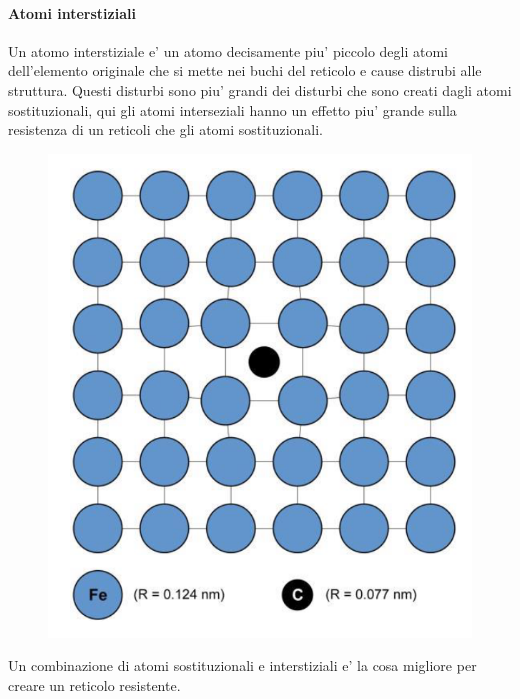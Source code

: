 \documentclass{article}
\begin{document}
                \paragraph{Atomi interstiziali}\mbox \\
                Un atomo interstiziale e' un atomo decisamente piu' piccolo degli atomi dell'elemento originale che si mette nei buchi del reticolo e cause distrubi alle struttura. Questi 
                disturbi sono piu' grandi dei disturbi che sono creati dagli atomi sostituzionali, qui gli atomi interseziali hanno un effetto piu' grande sulla resistenza di un reticoli 
                che gli atomi sostituzionali.
                \begin{figure}[ht]
                    \centering
                    \includegraphics[width=.85\linewidth]{Interstiziali.png}
                \end{figure}
                Un combinazione di atomi sostituzionali e interstiziali e' la cosa migliore per creare un reticolo resistente.
\end{document}
